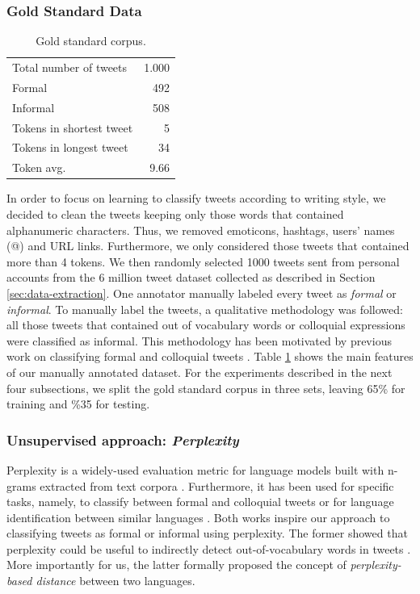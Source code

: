 \documentclass[information,article,submit,moreauthors,pdftex,10pt,a4paper]{Definitions/mdpi}
\begin{document}
\subsubsection{Gold Standard Data}\label{sec:gold-standard-data}

\begin{table}[H]
  \centering
  \begin{tabular}{lr} \hline \hline
    Total number of tweets & 1.000 \\
    Formal & 492 \\
    Informal & 508 \\
    Tokens in shortest tweet & 5 \\
    Tokens in longest tweet & 34 \\
    Token avg. & 9.66 \\ \hline
  \end{tabular}
  \caption{Gold standard corpus.}
  \label{tab:gold-corpus}
\end{table}

In order to focus on learning to classify tweets according to writing style, we decided to clean the tweets keeping only those words that contained alphanumeric characters. Thus, we removed emoticons, hashtags, users' names (@) and URL links. Furthermore, we only considered those tweets that contained more than 4 tokens. We then randomly selected 1000 tweets sent from personal accounts from the 6 million tweet dataset collected as described in Section \ref{sec:data-extraction}. One annotator manually labeled every tweet as \emph{formal} or \emph{informal}. To manually label the tweets, a qualitative methodology was followed: all those tweets that contained out of vocabulary words or colloquial expressions were classified as informal. This methodology has been motivated by previous work on classifying formal and colloquial tweets \cite{gonzalez2015analysis}. Table \ref{tab:gold-corpus} shows the main features of our manually annotated dataset. For the experiments described in the next four subsections, we split the gold standard corpus in three sets, leaving 65\% for training and \%35 for testing.

\subsubsection{Unsupervised approach: \textit{Perplexity}}\label{sec:unsup-appr-text}

Perplexity is a widely-used evaluation metric for language models built with n-grams extracted from text corpora \cite{chen1999empirical}. Furthermore, it has been used for specific tasks, namely, to classify between formal and colloquial tweets \cite{gonzalez2015analysis} or for language identification between similar languages \cite{gamallo2017language}. Both works inspire our approach to classifying tweets as formal or informal using perplexity. The former showed that perplexity could be useful to indirectly detect out-of-vocabulary words in tweets \cite{gonzalez2015analysis}. More importantly for us, the latter formally proposed the concept of \emph{perplexity-based distance} between two languages.
\end{document}
